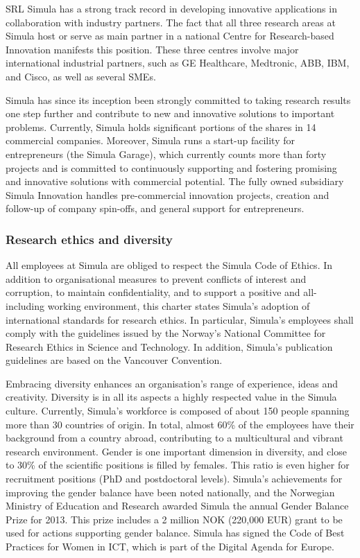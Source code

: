 \begin{sitedescription}{SRL}
Simula has a strong track record in developing innovative applications in collaboration with industry partners. The fact that all three research areas at Simula host or serve as main partner in a national Centre for Research-based Innovation manifests this position. These three centres involve major international industrial partners, such as GE Healthcare, Medtronic, ABB, IBM, and Cisco, as well as several SMEs.

Simula has since its inception been strongly committed to taking research results one step further and contribute to new and innovative solutions to important problems. Currently, Simula holds significant portions of the shares in 14 commercial companies. Moreover, Simula runs a start-up facility for entrepreneurs (the Simula Garage), which currently counts more than forty projects and is committed to continuously supporting and fostering promising and innovative solutions with commercial potential. The fully owned subsidiary Simula Innovation handles pre-commercial innovation projects, creation and follow-up of company spin-offs, and general support for entrepreneurs.

\subsubsection*{Research ethics and diversity}

All employees at Simula are obliged to respect the Simula Code of Ethics. In addition to organisational measures to prevent conflicts of interest and corruption, to maintain confidentiality, and to support a positive and all-including working environment, this charter states Simula’s adoption of international standards for research ethics. In particular, Simula’s employees shall comply with the guidelines issued by the Norway’s National Committee for Research Ethics in Science and Technology. In addition, Simula’s publication guidelines are based on the Vancouver Convention.

Embracing diversity enhances an organisation's range of experience, ideas and creativity. Diversity is in all its aspects a highly respected value in the Simula culture. Currently, Simula’s workforce is composed of about 150 people spanning more than 30 countries of origin. In total, almost 60\% of the employees have their background from a country abroad, contributing to a multicultural and vibrant research environment. Gender is one important dimension in diversity, and close to 30\% of the scientific positions is filled by females. This ratio is even higher for recruitment positions (PhD and postdoctoral levels). Simula's achievements for improving the gender balance have been noted nationally, and the Norwegian Ministry of Education and Research awarded Simula the annual Gender Balance Prize for 2013. This prize includes a 2 million NOK (220,000 EUR) grant to be used for actions supporting gender balance. Simula has signed the Code of Best Practices for Women in ICT, which is part of the Digital Agenda for Europe.


\end{sitedescription}
